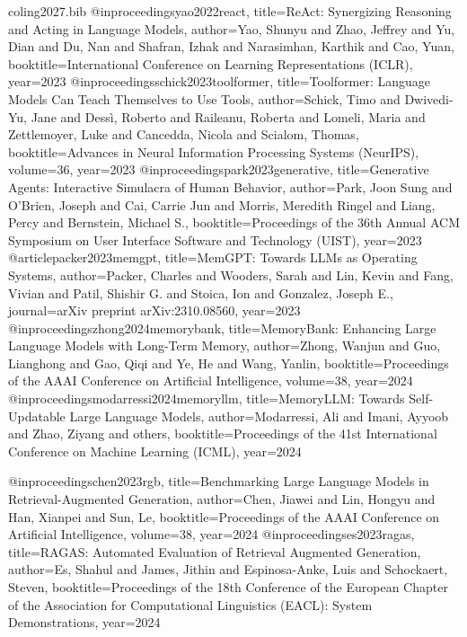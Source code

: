 \documentclass[11pt]{article}
\theoremstyle{remark}
\begin{document}
\begin{filecontents}{coling2027.bib}
@inproceedings{yao2022react,
  title={{ReAct}: Synergizing Reasoning and Acting in Language Models},
  author={Yao, Shunyu and Zhao, Jeffrey and Yu, Dian and Du, Nan and Shafran, Izhak and
          Narasimhan, Karthik and Cao, Yuan},
  booktitle={International Conference on Learning Representations (ICLR)}, year={2023}
}
@inproceedings{schick2023toolformer,
  title={Toolformer: Language Models Can Teach Themselves to Use Tools},
  author={Schick, Timo and Dwivedi-Yu, Jane and Dess{\`i}, Roberto and Raileanu, Roberta and
          Lomeli, Maria and Zettlemoyer, Luke and Cancedda, Nicola and Scialom, Thomas},
  booktitle={Advances in Neural Information Processing Systems (NeurIPS)}, volume={36}, year={2023}
}
@inproceedings{park2023generative,
  title={Generative Agents: Interactive Simulacra of Human Behavior},
  author={Park, Joon Sung and O'Brien, Joseph and Cai, Carrie Jun and Morris, Meredith Ringel and
          Liang, Percy and Bernstein, Michael S.},
  booktitle={Proceedings of the 36th Annual ACM Symposium on User Interface Software and Technology (UIST)},
  year={2023}
}
@article{packer2023memgpt,
  title={{MemGPT}: Towards {LLMs} as Operating Systems},
  author={Packer, Charles and Wooders, Sarah and Lin, Kevin and Fang, Vivian and
          Patil, Shishir G. and Stoica, Ion and Gonzalez, Joseph E.},
  journal={arXiv preprint arXiv:2310.08560}, year={2023}
}
@inproceedings{zhong2024memorybank,
  title={{MemoryBank}: Enhancing Large Language Models with Long-Term Memory},
  author={Zhong, Wanjun and Guo, Lianghong and Gao, Qiqi and Ye, He and Wang, Yanlin},
  booktitle={Proceedings of the AAAI Conference on Artificial Intelligence}, volume={38}, year={2024}
}
@inproceedings{modarressi2024memoryllm,
  title={{MemoryLLM}: Towards Self-Updatable Large Language Models},
  author={Modarressi, Ali and Imani, Ayyoob and Zhao, Ziyang and others},
  booktitle={Proceedings of the 41st International Conference on Machine Learning (ICML)}, year={2024}
}

@inproceedings{chen2023rgb,
  title={Benchmarking Large Language Models in Retrieval-Augmented Generation},
  author={Chen, Jiawei and Lin, Hongyu and Han, Xianpei and Sun, Le},
  booktitle={Proceedings of the AAAI Conference on Artificial Intelligence}, volume={38}, year={2024}
}
@inproceedings{es2023ragas,
  title={{RAGAS}: Automated Evaluation of Retrieval Augmented Generation},
  author={Es, Shahul and James, Jithin and Espinosa-Anke, Luis and Schockaert, Steven},
  booktitle={Proceedings of the 18th Conference of the European Chapter of the Association for
             Computational Linguistics (EACL): System Demonstrations}, year={2024}
}


\end{filecontents}
\end{document}
